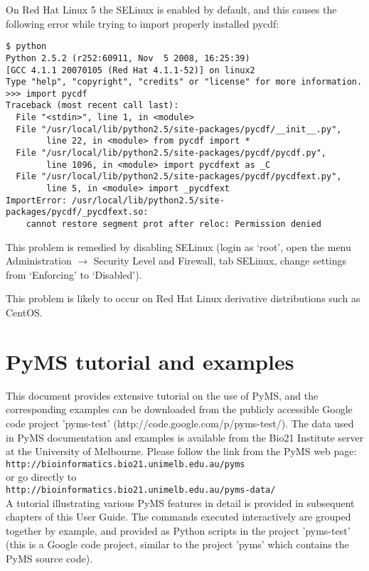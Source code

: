 On Red Hat Linux 5 the SELinux is enabled by default, and this causes the
following error while trying to import properly installed pycdf:

\begin{verbatim}
$ python
Python 2.5.2 (r252:60911, Nov  5 2008, 16:25:39)
[GCC 4.1.1 20070105 (Red Hat 4.1.1-52)] on linux2
Type "help", "copyright", "credits" or "license" for more information.
>>> import pycdf
Traceback (most recent call last):
  File "<stdin>", line 1, in <module>
  File "/usr/local/lib/python2.5/site-packages/pycdf/__init__.py",
        line 22, in <module> from pycdf import *
  File "/usr/local/lib/python2.5/site-packages/pycdf/pycdf.py",
        line 1096, in <module> import pycdfext as _C
  File "/usr/local/lib/python2.5/site-packages/pycdf/pycdfext.py",
        line 5, in <module> import _pycdfext
ImportError: /usr/local/lib/python2.5/site-packages/pycdf/_pycdfext.so:
    cannot restore segment prot after reloc: Permission denied
\end{verbatim}

This problem is remedied by disabling SELinux (login as `root', open the
menu Administration $\rightarrow$ Security Level and Firewall, tab SELinux,
change settings from `Enforcing' to `Disabled').

This problem is likely to occur on Red Hat Linux derivative distributions
such as CentOS.

\section{PyMS tutorial and examples}

This document provides extensive tutorial on the use of PyMS, and the
corresponding examples can be downloaded from the publicly accessible
Google code project 'pyms-test' (http://code.google.com/p/pyms-test/). 
The data used in PyMS documentation and examples is available from the
Bio21 Institute server at the University of Melbourne. Please follow
the link from the PyMS web page:\\
{\tt http://bioinformatics.bio21.unimelb.edu.au/pyms}\\
or go directly to\\
{\tt http://bioinformatics.bio21.unimelb.edu.au/pyms-data/}\\

A tutorial illustrating various PyMS features in detail is provided
in subsequent chapters of this User Guide. The commands executed
interactively are grouped together by example, and provided as
Python scripts in the project 'pyms-test' (this is a Google code
project, similar to the project 'pyms' which contains the PyMS
source code).

